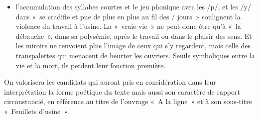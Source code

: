 {\begin{itemize}
retrouve également dans l'indétermination entre le rêve et la réalité à la troisième
strophe~: «~on sort du sommeil encore marqué de rêves / d'usine / Pour replonger dans
une autre nuit~». L'absence de fenêtres et de repères dans l'usine contribue à cette
sensation d'irréalité. La nuit, symboliquement associée à la mort qui est à l'œuvre dans
l'usine, envahit tout et brouille tous les repères. Seul signe de l'écoulement du temps,
la “tenue blanche maculée de sang” qui «~se cradifie et pue de plus en plus au fil des / jours~»~;
\item l'accumulation des syllabes courtes et le jeu phonique avec les /p/, et les /y/
dans «~se cradifie et pue de plus en plus au fil des / jours~» soulignent la violence du
travail à l'usine. La «~vraie vie~» ne peut donc être qu'à «~la débauche~», dans sa
polysémie, après le travail ou dans le plaisir des sens. Et les miroirs ne renvoient plus
l'image de ceux qui s'y regardent, mais celle des transpalettes qui menacent de heurter
les ouvriers. Seuils symboliques entre la vie et la mort, ils perdent leur fonction
première.
\end{itemize}

On valorisera les candidats qui auront pris en considération dans leur interprétation la
forme poétique du texte mais aussi son caractère de rapport circonstancié, en
référence au titre de l'ouvrage «~A la ligne~» et à son sous-titre «~Feuillets d'usine~».}%
